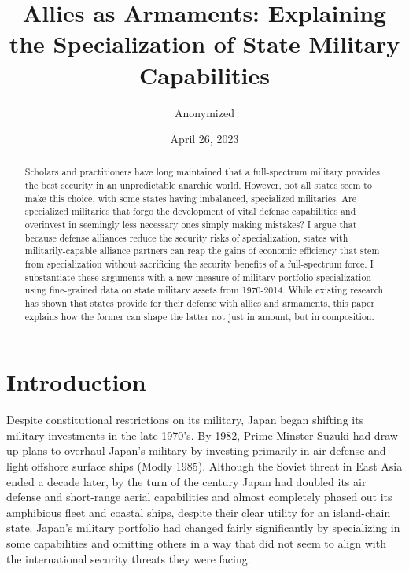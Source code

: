 \documentclass[
  12,
  letterpaper,
  DIV=11,
  numbers=noendperiod]{scrartcl}
\title{Allies as Armaments: Explaining the Specialization of State
Military Capabilities}
\author{Anonymized}
\date{April 26, 2023}
\begin{document}
\maketitle
\begin{abstract}
\singlespacing \noindent Scholars and practitioners have long maintained
that a full-spectrum military provides the best security in an
unpredictable anarchic world. However, not all states seem to make this
choice, with some states having imbalanced, specialized militaries. Are
specialized militaries that forgo the development of vital defense
capabilities and overinvest in seemingly less necessary ones simply
making mistakes? I argue that because defense alliances reduce the
security risks of specialization, states with militarily-capable
alliance partners can reap the gains of economic efficiency that stem
from specialization without sacrificing the security benefits of a
full-spectrum force. I substantiate these arguments with a new measure
of military portfolio specialization using fine-grained data on state
military assets from 1970-2014. While existing research has shown that
states provide for their defense with allies and armaments, this paper
explains how the former can shape the latter not just in amount, but in
composition.
\end{abstract}
\ifdefined\Shaded\renewenvironment{Shaded}{\begin{tcolorbox}[breakable, interior hidden, borderline west={3pt}{0pt}{shadecolor}, frame hidden, boxrule=0pt, sharp corners, enhanced]}{\end{tcolorbox}}\fi

\newpage

\hypertarget{sec-intro}{%
\section{Introduction}\label{sec-intro}}

Despite constitutional restrictions on its military, Japan began
shifting its military investments in the late 1970's. By 1982, Prime
Minster Suzuki had draw up plans to overhaul Japan's military by
investing primarily in air defense and light offshore surface ships
(Modly 1985). Although the Soviet threat in East Asia ended a decade
later, by the turn of the century Japan had doubled its air defense and
short-range aerial capabilities and almost completely phased out its
amphibious fleet and coastal ships, despite their clear utility for an
island-chain state. Japan's military portfolio had changed fairly
significantly by specializing in some capabilities and omitting others
in a way that did not seem to align with the international security
threats they were facing.
\end{document}
